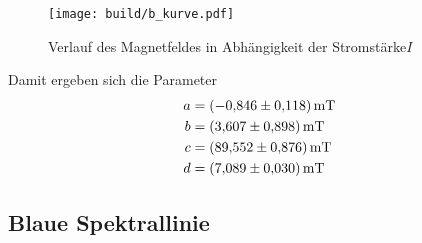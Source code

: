 \begin{figure}
    \centering
    \texttt{[image: build/b\_kurve.pdf]}
    \caption{Verlauf des Magnetfeldes in Abhängigkeit der Stromstärke$I$}
    \label{fig:mag_verlauf}
\end{figure}

Damit ergeben sich die Parameter 
\begin{align*}
    a &= \SI{-0.846(118)}{\milli\tesla} \\
    b &= \SI{3.607 (898)}{\milli\tesla} \\
    c &= \SI{89.552(876)}{\milli\tesla} \\
    d &= \SI{7.089 (030)}{\milli\tesla}
\end{align*}

\subsection{Blaue Spektrallinie}

